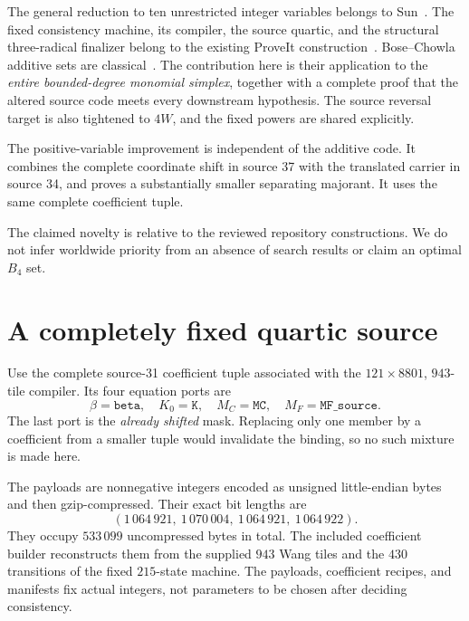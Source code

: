 \documentclass[11pt,letterpaper]{article}
\theoremstyle{remark}
\begin{document}
The general reduction to ten unrestricted integer variables belongs to
Sun~\cite{sun2026}. The fixed consistency machine, its compiler, the
source quartic, and the structural three-radical finalizer belong to the
existing ProveIt construction~\cite{repo}. Bose--Chowla additive sets are
classical~\cite{bosechowla}. The contribution here is their application
to the \emph{entire bounded-degree monomial simplex}, together with a
complete proof that the altered source code meets every downstream
hypothesis. The source reversal target is also tightened to \(4W\),
and the fixed powers are shared explicitly.

The positive-variable improvement is independent of the additive code.
It combines the complete coordinate shift in source 37 with the
translated carrier in source 34, and proves a substantially smaller
separating majorant. It uses the same complete coefficient tuple.

The claimed novelty is relative to the reviewed repository
constructions. We do not infer worldwide priority from an absence of
search results or claim an optimal \(B_4\) set.

\section{A completely fixed quartic source}
\label{sec:fixed}

Use the complete source-31 coefficient tuple associated with the
\(121\times8801\), \(943\)-tile compiler. Its four equation ports are
\[
\beta=\texttt{beta},\quad K_0=\texttt{K},\quad
M_C=\texttt{MC},\quad M_F=\texttt{MF\_source}.
\]
The last port is the \emph{already shifted} mask. Replacing only one
member by a coefficient from a smaller tuple would invalidate the
binding, so no such mixture is made here.

The payloads are nonnegative integers encoded as unsigned little-endian
bytes and then gzip-compressed. Their exact bit lengths are
\[
(1\,064\,921,\ 1\,070\,004,\ 1\,064\,921,\ 1\,064\,922).
\]
They occupy \(533\,099\) uncompressed bytes in total. The included
coefficient builder reconstructs them from the supplied \(943\) Wang
tiles and the \(430\) transitions of the fixed \(215\)-state machine.
The payloads, coefficient recipes, and manifests fix actual integers,
not parameters to be chosen after deciding consistency.
\end{document}
